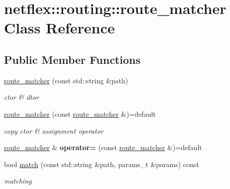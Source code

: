 \hypertarget{classnetflex_1_1routing_1_1route__matcher}{}\section{netflex\+:\+:routing\+:\+:route\+\_\+matcher Class Reference}
\label{classnetflex_1_1routing_1_1route__matcher}
\subsection*{Public Member Functions}
\begin{DoxyCompactItemize}
\item 
\mbox{\label{classnetflex_1_1routing_1_1route__matcher_a9cf8d8ed16becad2d6952f66caed18c0}} 
\hyperlink{classnetflex_1_1routing_1_1route__matcher_a9cf8d8ed16becad2d6952f66caed18c0}{route\+\_\+matcher} (const std\+::string \&path)
\begin{DoxyCompactList}\small\item\em ctor \& dtor \end{DoxyCompactList}\item 
\mbox{\label{classnetflex_1_1routing_1_1route__matcher_a684097e48fdf58790bfa7d5325b0dfa2}} 
\hyperlink{classnetflex_1_1routing_1_1route__matcher_a684097e48fdf58790bfa7d5325b0dfa2}{route\+\_\+matcher} (const \hyperlink{classnetflex_1_1routing_1_1route__matcher}{route\+\_\+matcher} \&)=default
\begin{DoxyCompactList}\small\item\em copy ctor \& assignment operator \end{DoxyCompactList}\item 
\mbox{\label{classnetflex_1_1routing_1_1route__matcher_aa0d6e82c9d745efc6d2dd16afa4415c4}} 
\hyperlink{classnetflex_1_1routing_1_1route__matcher}{route\+\_\+matcher} \& {\bfseries operator=} (const \hyperlink{classnetflex_1_1routing_1_1route__matcher}{route\+\_\+matcher} \&)=default
\item 
\mbox{\label{classnetflex_1_1routing_1_1route__matcher_ac0833b3f5d97b427ca9cc35ff95b477b}} 
bool \hyperlink{classnetflex_1_1routing_1_1route__matcher_ac0833b3f5d97b427ca9cc35ff95b477b}{match} (const std\+::string \&path, params\+\_\+t \&params) const
\begin{DoxyCompactList}\small\item\em matching \end{DoxyCompactList}\end{DoxyCompactItemize}
